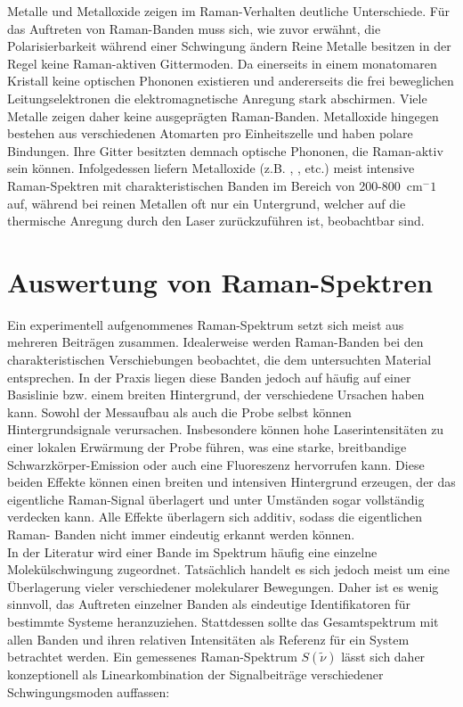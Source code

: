 Metalle und Metalloxide zeigen im Raman-Verhalten deutliche Unterschiede. Für das Auftreten von Raman-Banden muss sich, wie zuvor erwähnt, die Polarisierbarkeit während einer Schwingung ändern
Reine Metalle besitzen in der Regel keine Raman-aktiven Gittermoden. Da einerseits in einem monatomaren Kristall keine optischen Phononen existieren und andererseits die frei beweglichen 
Leitungselektronen die elektromagnetische Anregung stark abschirmen.
Viele Metalle zeigen daher keine ausgeprägten Raman-Banden. Metalloxide hingegen bestehen aus verschiedenen Atomarten pro Einheitszelle und haben polare Bindungen. Ihre Gitter besitzten demnach 
optische Phononen, die Raman-aktiv sein können. Infolgedessen liefern Metalloxide (z.B. , ,  etc.) meist intensive Raman-Spektren mit 
charakteristischen Banden im Bereich von 200-800~cm$^-1$ auf, während bei reinen Metallen oft nur ein Untergrund, welcher auf die thermische Anregung durch den Laser zurückzuführen ist, beobachtbar sind.
\clearpage
\section{Auswertung von Raman-Spektren}\label{sec:analysis}
Ein experimentell aufgenommenes Raman-Spektrum setzt sich meist aus mehreren Beiträgen zusammen. Idealerweise werden Raman-Banden bei den charakteristischen Verschiebungen beobachtet, die 
dem untersuchten Material entsprechen. In der Praxis liegen diese Banden jedoch auf häufig auf einer Basislinie bzw. einem breiten Hintergrund, der verschiedene Ursachen haben kann. Sowohl 
der Messaufbau als auch die Probe selbst können Hintergrundsignale verursachen. Insbesondere können hohe Laserintensitäten zu einer lokalen Erwärmung der Probe führen, was eine starke, 
breitbandige Schwarzkörper-Emission oder auch eine  Fluoreszenz hervorrufen kann. Diese beiden Effekte können einen breiten und intensiven Hintergrund erzeugen, der das eigentliche 
Raman-Signal überlagert und unter Umständen sogar vollständig verdecken kann. Alle Effekte überlagern sich additiv, sodass die eigentlichen Raman-
Banden nicht immer eindeutig erkannt werden können.\\
In der Literatur wird einer Bande im Spektrum häufig eine einzelne Molekülschwingung zugeordnet. Tatsächlich handelt es sich jedoch meist um eine Überlagerung vieler verschiedener
molekularer Bewegungen. Daher ist es wenig sinnvoll, das Auftreten einzelner Banden als eindeutige Identifikatoren für bestimmte Systeme heranzuziehen. Stattdessen sollte das 
Gesamtspektrum mit allen Banden und ihren relativen Intensitäten als Referenz für ein System betrachtet werden. Ein gemessenes Raman-Spektrum $S(\tilde{\nu})$ lässt sich daher 
konzeptionell als Linearkombination der Signalbeiträge verschiedener Schwingungsmoden auffassen:

